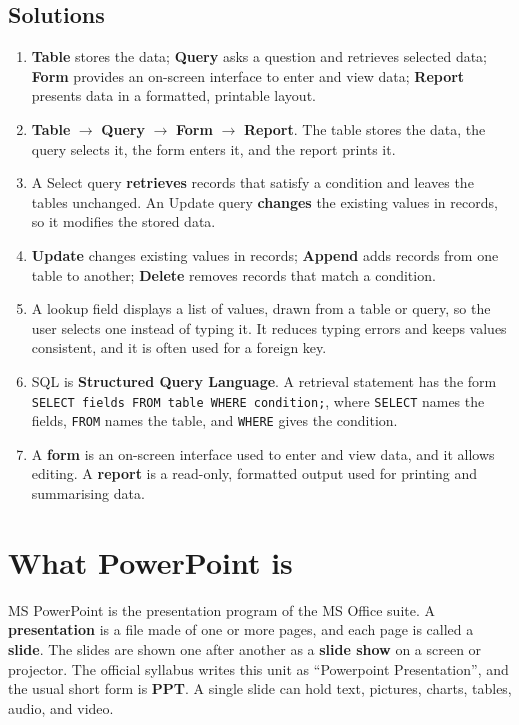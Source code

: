 \subsection*{Solutions}
\begingroup\small
\begin{enumerate}[label=\arabic*.]
  \item \textbf{Table} stores the data; \textbf{Query} asks a question and
    retrieves selected data; \textbf{Form} provides an on-screen interface to
    enter and view data; \textbf{Report} presents data in a formatted,
    printable layout.
  \item \textbf{Table} $\rightarrow$ \textbf{Query} $\rightarrow$
    \textbf{Form} $\rightarrow$ \textbf{Report}. The table stores the data,
    the query selects it, the form enters it, and the report prints it.
  \item A Select query \textbf{retrieves} records that satisfy a condition
    and leaves the tables unchanged. An Update query \textbf{changes} the
    existing values in records, so it modifies the stored data.
  \item \textbf{Update} changes existing values in records;
    \textbf{Append} adds records from one table to another;
    \textbf{Delete} removes records that match a condition.
  \item A lookup field displays a list of values, drawn from a table or
    query, so the user selects one instead of typing it. It reduces typing
    errors and keeps values consistent, and it is often used for a foreign
    key.
  \item SQL is \textbf{Structured Query Language}. A retrieval statement has
    the form \texttt{SELECT fields FROM table WHERE condition;}, where
    \texttt{SELECT} names the fields, \texttt{FROM} names the table, and
    \texttt{WHERE} gives the condition.
  \item A \textbf{form} is an on-screen interface used to enter and view
    data, and it allows editing. A \textbf{report} is a read-only, formatted
    output used for printing and summarising data.
\end{enumerate}
\endgroup

\section{What PowerPoint is}
MS PowerPoint is the presentation program of the MS Office suite. A
\textbf{presentation} is a file made of one or more pages, and each page is
called a \textbf{slide}. The slides are shown one after another as a
\textbf{slide show} on a screen or projector. The official syllabus writes
this unit as ``Powerpoint Presentation'', and the usual short form is
\textbf{PPT}. A single slide can hold text, pictures, charts, tables, audio,
and video.

